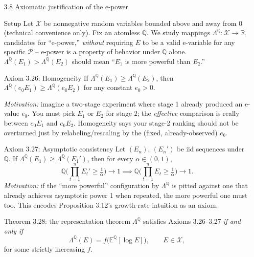 \documentclass[aspectratio=169,10pt]{beamer}
\newcommand{\QQ}{\mathbb{Q}}
\newcommand{\EE}{\mathbb{E}}
\newcommand{\RR}{\mathbb{R}}
\newcommand{\calP}{\mathcal{P}}
\newcommand{\calX}{\mathcal{X}}
\begin{document}
\begin{frame}[allowframebreaks]{3.8 Axiomatic justification of the e-power}
  \begin{block}{Setup}
    Let $\calX$ be nonnegative random variables bounded above and away from $0$ (technical convenience only). Fix an atomless $\QQ$. We study mappings $\Lambda^\QQ:\calX\to\RR$, candidates for ``e-power,'' \emph{without} requiring $E$ to be a valid e-variable for any specific $\calP$ -- e-power is a property of behavior under $\QQ$ alone. $\Lambda^\QQ(E_1)>\Lambda^\QQ(E_2)$ should mean ``$E_1$ is more powerful than $E_2$.''
  \end{block}

  \begin{block}{Axiom 3.26: Homogeneity}
    If $\Lambda^\QQ(E_1)\ge\Lambda^\QQ(E_2)$, then $\Lambda^\QQ(e_0 E_1)\ge \Lambda^\QQ(e_0 E_2)$ for any constant $e_0>0$.

    \emph{Motivation:} imagine a two-stage experiment where stage 1 already produced an e-value $e_0$. You must pick $E_1$ or $E_2$ for stage 2; the \emph{effective} comparison is really between $e_0E_1$ and $e_0E_2$. Homogeneity says your stage-2 ranking should not be overturned just by relabeling/rescaling by the (fixed, already-observed) $e_0$.
  \end{block}

  \begin{block}{Axiom 3.27: Asymptotic consistency}
    Let $(E_n)$, $(E_n')$ be iid sequences under $\QQ$. If $\Lambda^\QQ(E_1)\ge\Lambda^\QQ(E_1')$, then for every $\alpha\in(0,1)$,
    \[
      \QQ\Big(\textstyle\prod_{t=1}^n E_t' \ge \tfrac1\alpha\Big)\to 1 \implies \QQ\Big(\textstyle\prod_{t=1}^n E_t \ge \tfrac1\alpha\Big)\to 1.
    \]
    \emph{Motivation:} if the ``more powerful'' configuration by $\Lambda^\QQ$ is pitted against one that already achieves asymptotic power 1 when repeated, the more powerful one must too. This encodes Proposition 3.12's growth-rate intuition as an axiom.
  \end{block}

  \framebreak

  \begin{block}{Theorem 3.28: the representation theorem}
    $\Lambda^\QQ$ satisfies Axioms 3.26--3.27 \emph{if and only if}
    \[
      \Lambda^\QQ(E) = f\big(\EE^\QQ[\log E]\big), \qquad E\in\calX,
    \]
    for some strictly increasing $f$.
  \end{block}


\end{frame}
\end{document}
